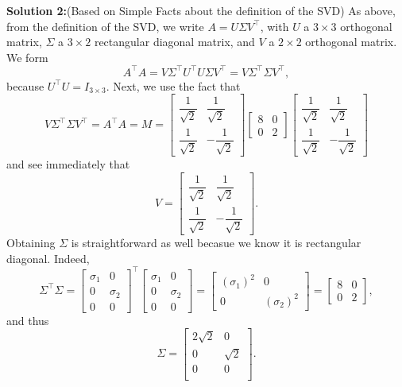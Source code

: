 \documentclass[letterpaper]{article}
\begin{document}
\begin{enumerate}
      \textbf{Solution 2:}(Based on Simple Facts about the definition of the SVD) As above, from the definition of the SVD, we write $A=U\Sigma V^\top$, with $U$ a $3 \times 3$ orthogonal matrix,  $\Sigma$ a ${3\times 2}$ rectangular diagonal matrix, and $V$ a ${2\times 2}$ orthogonal matrix. We form
      $$A^\top A=V\Sigma^\top U^\top U\Sigma V^\top = V\Sigma^\top \Sigma V^\top,$$
      because $U^\top U=I_{3\times3}$. Next, we use the fact that
      $$ V\Sigma^\top \Sigma V^\top=A^\top A = M=\left[  \begin{array}{cc} \dfrac{1}{\sqrt{2}} & \dfrac{1}{\sqrt{2}}\\[5mm] \dfrac{1}{\sqrt{2}} & -\dfrac{1}{\sqrt{2}}\end{array} \right]
  \left[  \begin{array}{cc} 8 & 0 \\[2mm] 0 & 2\end{array} \right]
  \left[  \begin{array}{cc} \dfrac{1}{\sqrt{2}} & \dfrac{1}{\sqrt{2}}\\[5mm] \dfrac{1}{\sqrt{2}} & -\dfrac{1}{\sqrt{2}}\end{array} \right]$$
  and see immediately that
  \begin{equation*}
        V=\left[  \begin{array}{cc} \dfrac{1}{\sqrt{2}} & \dfrac{1}{\sqrt{2}}\\[5mm] \dfrac{1}{\sqrt{2}} & -\dfrac{1}{\sqrt{2}}\end{array} \right].
      \end{equation*}
      Obtaining $\Sigma$ is straightforward as well becasue we know it is rectangular diagonal. Indeed,
      $$\Sigma^\top \Sigma = \left[  \begin{array}{cc} \sigma_1 & 0 \\ 0 & \sigma_2 \\ 0 & 0\end{array} \right]^\top \left[  \begin{array}{cc} \sigma_1 & 0 \\ 0 & \sigma_2 \\ 0 & 0\end{array} \right] = \left[  \begin{array}{cc} (\sigma_1)^2 & 0 \\ 0 & (\sigma_2)^2 \end{array} \right]= \left[  \begin{array}{cc} 8 & 0 \\[2mm] 0 & 2\end{array} \right], $$
      and thus
      $$ \Sigma =\left[\begin{array}{cc} 2\sqrt{2} & 0 \\ 0& \sqrt{2} \\0 & 0 \\ \end{array} \right].$$
\end{enumerate}
\end{document}
